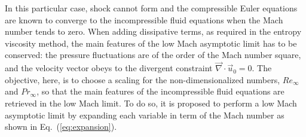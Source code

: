 \documentclass[preprint,10pt]{elsarticle}
\renewcommand{\div}{\vec{\nabla}\! \cdot \!}
\newcommand{\eqt}[1]{Eq.~(\ref{#1})}                     %
\begin{document}
\begin{itemize}
In this particular case, shock cannot form and the compressible Euler equations are known to converge to the incompressible fluid equations when the Mach number tends to zero. When adding dissipative terms, as required in the entropy viscosity method, the main features of the low Mach asymptotic limit has to be conserved: the pressure fluctuations are of the order of the Mach number square, and the velocity vector obeys to the divergent constraint $\div \vec{u}_0 = 0$. The objective, here, is to choose a scaling for the non-dimensionalized numbers, $Re_\infty$ and $Pr_\infty$, so that the main features of the incompressible fluid equations are retrieved in the low Mach limit. To do so, it is proposed to perform a low Mach asymptotic limit by expanding each variable in term of the Mach number as shown in \eqt{eq:expansion}. 


\end{itemize}
\end{document}
